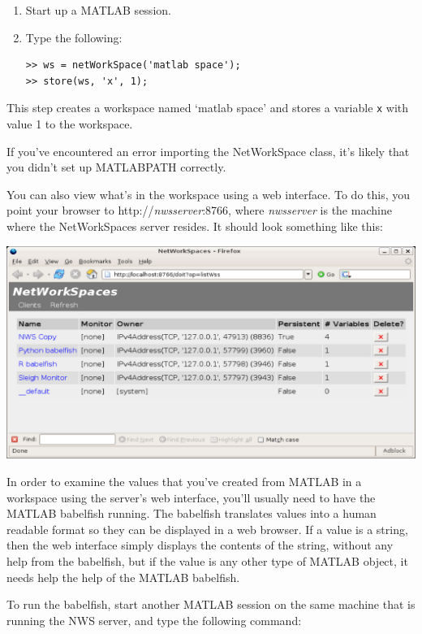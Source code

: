\begin{enumerate}
\item Start up a MATLAB session.
\item Type the following:
\begin{samepage}
\begin{verbatim}
>> ws = netWorkSpace('matlab space');
>> store(ws, 'x', 1);
\end{verbatim}
\end{samepage}
\end{enumerate}

This step creates a workspace named `matlab space' and stores a variable
\texttt{x} with value 1 to the workspace.

If you've encountered an error importing the NetWorkSpace class, it's likely
that you didn't set up MATLABPATH correctly.

You can also view what's in the workspace using a web interface.  To do this,
you point your browser to http://\textit{nwsserver}:8766, where
\textit{nwsserver} is the machine where the NetWorkSpaces server resides.
It should look something like this:

\includegraphics[width=5.95in]{webinterface.eps}

In order to examine the values that you've created from MATLAB in a
workspace using the server's web interface, you'll usually need to have
the MATLAB babelfish running.  The babelfish translates values into a
human readable format so they can be displayed in a web browser.  If a
value is a string, then the web interface simply displays the contents
of the string, without any help from the babelfish, but if the value is
any other type of MATLAB object, it needs help the help of the MATLAB
babelfish.

To run the babelfish, start another MATLAB session on the same machine
that is running the NWS server, and type the following command:

